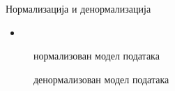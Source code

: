 \documentclass{beamer}
\begin{document}
    \begin{frame}[allowframebreaks]{Нормализација и денормализација}
        \begin{itemize}
            \item 
        \end{itemize}
        
        \framebreak
        
        \begin{figure}
            \centering
            \caption{нормализован модел података}
            \label{fig:orm}
        \end{figure}
        
        \framebreak
        
        \begin{figure}
            \centering
            \caption{денормализован модел података}
            \label{fig:orm}
        \end{figure}
    \end{frame}
    
\end{document}
